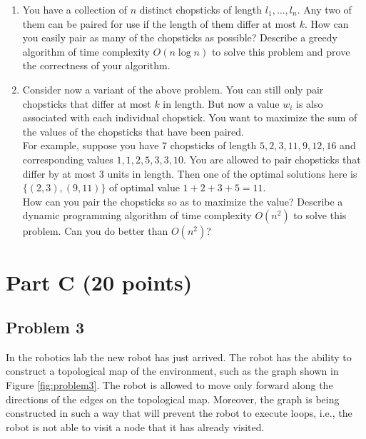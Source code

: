 \documentclass[11pt]{article}
\begin{document}
\begin{enumerate}[label=\Alph*.]

\item You have a collection of $n$ distinct chopsticks of
length $l_{1},\dots,l_{n}$. Any two of them can be paired for use if
the length of them differ at most $k$. How can you easily pair as many
of the chopsticks as possible? Describe a greedy algorithm of time
complexity $O(n\log n)$ to solve this problem and prove the
correctness of your algorithm.\\

\item Consider now a variant of the above problem. You
can still only pair chopsticks that differ at most $k$ in length. But
now a value $w_{i}$ is also associated with each individual
chopstick. You want to maximize the sum of the values of the
chopsticks that have been paired.\\

\noindent For example, suppose you have 7 chopsticks of length
$5,2,3,11,9,12,16$ and corresponding values $1,1,2,5,3,3,10$. You are
allowed to pair chopsticks that differ by at most 3 units in
length. Then one of the optimal solutions here is $\{ (2,3),(9,11) \}$
of optimal value $1+2+3+5=11$.\\

\noindent How can you pair the chopsticks so as to maximize the value?
Describe a dynamic programming algorithm of time complexity $O(n^{2})$
to solve this problem. Can you do better than $O(n^{2})$?\\

\end{enumerate}

\section*{Part C (20 points)}

\subsection*{Problem 3} In the robotics lab the new robot has just
arrived. The robot has the ability to construct a topological map of
the environment, such as the graph shown in Figure
\ref{fig:problem3}. The robot is allowed to move only forward along
the directions of the edges on the topological map. Moreover, the
graph is being constructed in such a way that will prevent the robot
to execute loops, i.e., the robot is not able to visit a node that it
has already visited.\\
\end{document}
